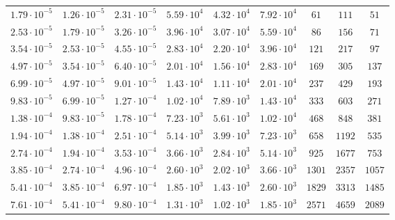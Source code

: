 \begin{tabular}{c c c c c c c c c}
$1.79{\cdot} 10^{-5}$ & $1.26{\cdot} 10^{-5}$ & $2.31{\cdot} 10^{-5}$ & $5.59{\cdot} 10^{4}$ & $4.32{\cdot} 10^{4}$ & $7.92{\cdot} 10^{4}$ & $        61$ & $       111$ & $     51$\\
$2.53{\cdot} 10^{-5}$ & $1.79{\cdot} 10^{-5}$ & $3.26{\cdot} 10^{-5}$ & $3.96{\cdot} 10^{4}$ & $3.07{\cdot} 10^{4}$ & $5.59{\cdot} 10^{4}$ & $        86$ & $       156$ & $     71$\\
$3.54{\cdot} 10^{-5}$ & $2.53{\cdot} 10^{-5}$ & $4.55{\cdot} 10^{-5}$ & $2.83{\cdot} 10^{4}$ & $2.20{\cdot} 10^{4}$ & $3.96{\cdot} 10^{4}$ & $       121$ & $       217$ & $     97$\\
$4.97{\cdot} 10^{-5}$ & $3.54{\cdot} 10^{-5}$ & $6.40{\cdot} 10^{-5}$ & $2.01{\cdot} 10^{4}$ & $1.56{\cdot} 10^{4}$ & $2.83{\cdot} 10^{4}$ & $       169$ & $       305$ & $    137$\\
$6.99{\cdot} 10^{-5}$ & $4.97{\cdot} 10^{-5}$ & $9.01{\cdot} 10^{-5}$ & $1.43{\cdot} 10^{4}$ & $1.11{\cdot} 10^{4}$ & $2.01{\cdot} 10^{4}$ & $       237$ & $       429$ & $    193$\\
$9.83{\cdot} 10^{-5}$ & $6.99{\cdot} 10^{-5}$ & $1.27{\cdot} 10^{-4}$ & $1.02{\cdot} 10^{4}$ & $7.89{\cdot} 10^{3}$ & $1.43{\cdot} 10^{4}$ & $       333$ & $       603$ & $    271$\\
$1.38{\cdot} 10^{-4}$ & $9.83{\cdot} 10^{-5}$ & $1.78{\cdot} 10^{-4}$ & $7.23{\cdot} 10^{3}$ & $5.61{\cdot} 10^{3}$ & $1.02{\cdot} 10^{4}$ & $       468$ & $       848$ & $    381$\\
$1.94{\cdot} 10^{-4}$ & $1.38{\cdot} 10^{-4}$ & $2.51{\cdot} 10^{-4}$ & $5.14{\cdot} 10^{3}$ & $3.99{\cdot} 10^{3}$ & $7.23{\cdot} 10^{3}$ & $       658$ & $      1192$ & $    535$\\
$2.74{\cdot} 10^{-4}$ & $1.94{\cdot} 10^{-4}$ & $3.53{\cdot} 10^{-4}$ & $3.66{\cdot} 10^{3}$ & $2.84{\cdot} 10^{3}$ & $5.14{\cdot} 10^{3}$ & $       925$ & $      1677$ & $    753$\\
$3.85{\cdot} 10^{-4}$ & $2.74{\cdot} 10^{-4}$ & $4.96{\cdot} 10^{-4}$ & $2.60{\cdot} 10^{3}$ & $2.02{\cdot} 10^{3}$ & $3.66{\cdot} 10^{3}$ & $      1301$ & $      2357$ & $   1057$\\
$5.41{\cdot} 10^{-4}$ & $3.85{\cdot} 10^{-4}$ & $6.97{\cdot} 10^{-4}$ & $1.85{\cdot} 10^{3}$ & $1.43{\cdot} 10^{3}$ & $2.60{\cdot} 10^{3}$ & $      1829$ & $      3313$ & $   1485$\\
$7.61{\cdot} 10^{-4}$ & $5.41{\cdot} 10^{-4}$ & $9.80{\cdot} 10^{-4}$ & $1.31{\cdot} 10^{3}$ & $1.02{\cdot} 10^{3}$ & $1.85{\cdot} 10^{3}$ & $      2571$ & $      4659$ & $   2089$\\

\end{tabular}
